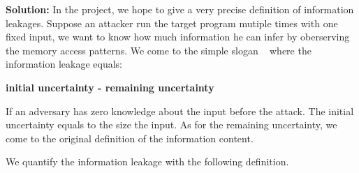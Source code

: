 \begin{figure}
\centering
{}
\end{figure}

\textbf{Solution:}
In the project, we hope to give a very precise definition of information leakages. 
Suppose an attacker run the target program mutiple times with one fixed input, we
want to know how much information he can infer by oberserving the memory access patterns.
We come to the simple slogan ~\cite{10.1007/978-3-642-00596-1_21} where the information
leakage equals:

\textbf{initial uncertainty - remaining uncertainty}

If an adversary has zero knowledge about the input before the attack. The initial uncertainty
equals to the size the input. As for the remaining uncertainty, we come to the original definition
of the information content.

We quantify the information leakage with the following definition. 

